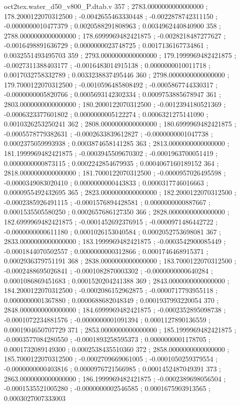 \begin{filecontents}[overwrite]{oct2tex.water_d50_v800_P.dtab.v}
357 ; 2783.0000000000000000 ; 178.2000122070312500 ; -0.0042655463330448 ; -0.0022878742311150 ; -0.0000000010477379 ; 0.0020588291808963 ; 0.0034962440840900
358 ; 2788.0000000000000000 ; 178.6999969482421875 ; -0.0028218487277627 ; -0.0016498891636729 ; 0.0000000023748725 ; 0.0017136167734861 ; 0.0032551493495703
359 ; 2793.0000000000000000 ; 179.1999969482421875 ; -0.0027311388403177 ; -0.0016483014915138 ; 0.0000000010011718 ; 0.0017032758332789 ; 0.0033238837495446
360 ; 2798.0000000000000000 ; 179.7000122070312500 ; -0.0010596485808492 ; -0.0005867744330317 ; -0.0000000005820766 ; 0.0005693142302334 ; 0.0009753885678947
361 ; 2803.0000000000000000 ; 180.2000122070312500 ; -0.0012394180521369 ; -0.0006323377601802 ; 0.0000000005122274 ; 0.0006321275141090 ; 0.0010326253250241
362 ; 2808.0000000000000000 ; 180.6999969482421875 ; -0.0005578779382631 ; -0.0002633839612827 ; -0.0000000001047738 ; 0.0002375059993938 ; 0.0003874658141285
363 ; 2813.0000000000000000 ; 181.1999969482421875 ; -0.0003945509670302 ; -0.0001963700051419 ; 0.0000000000873115 ; 0.0002242854679935 ; 0.0004067160189152
364 ; 2818.0000000000000000 ; 181.7000122070312500 ; -0.0000957026495598 ; -0.0000349083020410 ; 0.0000000000443833 ; 0.0000317746016663 ; 0.0000955492432695
365 ; 2823.0000000000000000 ; 182.2000122070312500 ; -0.0002385926491115 ; -0.0001576894428581 ; 0.0000000000887667 ; 0.0001535505580250 ; 0.0002657686127350
366 ; 2828.0000000000000000 ; 182.6999969482421875 ; -0.0001452692376915 ; -0.0000971486442722 ; -0.0000000000611180 ; 0.0001026153040584 ; 0.0002052753698081
367 ; 2833.0000000000000000 ; 183.1999969482421875 ; -0.0003542900085449 ; -0.0001844070502557 ; 0.0000000000312866 ; 0.0001746468915371 ; 0.0002936379751191
368 ; 2838.0000000000000000 ; 183.7000122070312500 ; -0.0002488695026841 ; -0.0001082870003302 ; -0.0000000000640284 ; 0.0001086869451683 ; 0.0001520204241388
369 ; 2843.0000000000000000 ; 184.2000122070312500 ; -0.0002086152962875 ; -0.0000717793955118 ; 0.0000000001367880 ; 0.0000688682048349 ; 0.0001937993220054
370 ; 2848.0000000000000000 ; 184.6999969482421875 ; -0.0002352895098738 ; -0.0001072234881576 ; -0.0000000001091394 ; 0.0001127890136559 ; 0.0001904650707729
371 ; 2853.0000000000000000 ; 185.1999969482421875 ; -0.0003577084280550 ; -0.0001893258595373 ; 0.0000000001178705 ; 0.0001732089149300 ; 0.0002538435510360
372 ; 2858.0000000000000000 ; 185.7000122070312500 ; -0.0002709669061005 ; -0.0001050259379554 ; -0.0000000000403816 ; 0.0000976721566985 ; 0.0001452487049391
373 ; 2863.0000000000000000 ; 186.1999969482421875 ; -0.0002389698056504 ; -0.0001535521005280 ; -0.0000000002546585 ; 0.0001675903913565 ; 0.0003027007333003

\end{filecontents}
